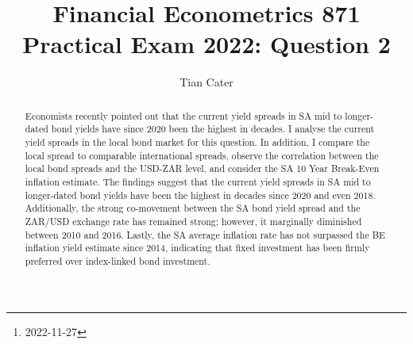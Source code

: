 \documentclass[11pt,preprint, authoryear]{elsarticle}
\numberwithin{equation}{section}
\numberwithin{figure}{section}
\numberwithin{table}{section}
\let\rmarkdownfootnote\footnote%
\def\footnote{\protect\rmarkdownfootnote}
\begin{document}
\begin{frontmatter}  %

\title{Financial Econometrics 871 Practical Exam 2022: Question 2}





\author[Add1]{Tian Cater}





\address[Add1]{University of Stellenbosch, Western Cape, South
Africa\footnote{2022-11-27}}


\begin{abstract}
\small{
Economists recently pointed out that the current yield spreads in SA mid
to longer-dated bond yields have since 2020 been the highest in decades.
I analyse the current yield spreads in the local bond market for this
question. In addition, I compare the local spread to comparable
international spreads, observe the correlation between the local bond
spreads and the USD-ZAR level, and consider the SA 10 Year Break-Even
inflation estimate. The findings suggest that the current yield spreads
in SA mid to longer-dated bond yields have been the highest in decades
since 2020 and even 2018. Additionally, the strong co-movement between
the SA bond yield spread and the ZAR/USD exchange rate has remained
strong; however, it marginally diminished between 2010 and 2016. Lastly,
the SA average inflation rate has not surpassed the BE inflation yield
estimate since 2014, indicating that fixed investment has been firmly
preferred over index-linked bond investment.
}
\end{abstract}

\vspace{1cm}





\vspace{0.5cm}

\end{frontmatter}



\pagestyle{fancy}
\chead{}
\lfoot{}
\lhead{}
\cfoot{}

\end{document}
